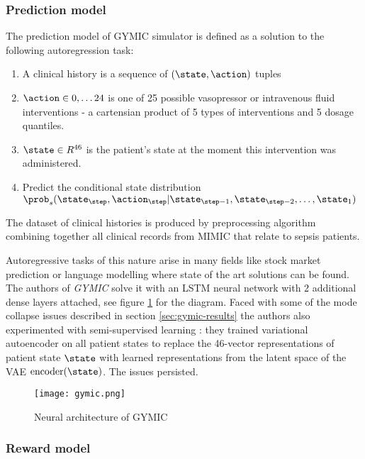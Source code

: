 \subsubsection{Prediction model}
The prediction model of GYMIC simulator is defined as a solution to the following autoregression task:
\begin{enumerate}
    \item A clinical history is a sequence of $(\state, \action)$ tuples
    \item $\action \in 0,\dots 24$ is one of 25 possible vasopressor or intravenous fluid interventions - a cartensian product of 5 types of interventions and 5 dosage quantiles. 
    \item $\state \in R^{46}$ is the patient's state at the moment this intervention was administered.
    \item Predict the conditional state distribution $\prob_s(\state_\step, \action_\step | \state_{\step-1},\state_{\step-2},\dots,\state_1)$
\end{enumerate}

The dataset of clinical histories is produced by \action preprocessing algorithm combining together all clinical records from MIMIC that relate to sepsis patients.

Autoregressive tasks of this nature arise in many fields like stock market prediction \cite{stonks1,stonks2} or language modelling \cite{langmodels} where state of the art solutions can be found.
The authors of \emph{GYMIC} solve it with an LSTM \cite{hochreiterLongShorttermMemory1997} neural network with 2 additional dense layers attached, see figure \ref{fig:gymic} for the diagram.
Faced with some of the mode collapse issues described in section \ref{sec:gymic-results} the authors also experimented with semi-supervised learning \cite{semi-supervised}: they trained \action variational autoencoder \cite{vae} on all patient states to replace the 46-vector representations of patient state $\state$ with learned representations from the latent space of the VAE $\text{encoder}(\state)$.
The issues persisted.

\begin{figure}
    \centering
    \texttt{[image: gymic.png]}
    \caption{Neural architecture of GYMIC}
    \label{fig:gymic}
\end{figure}

\subsubsection{Reward model}

